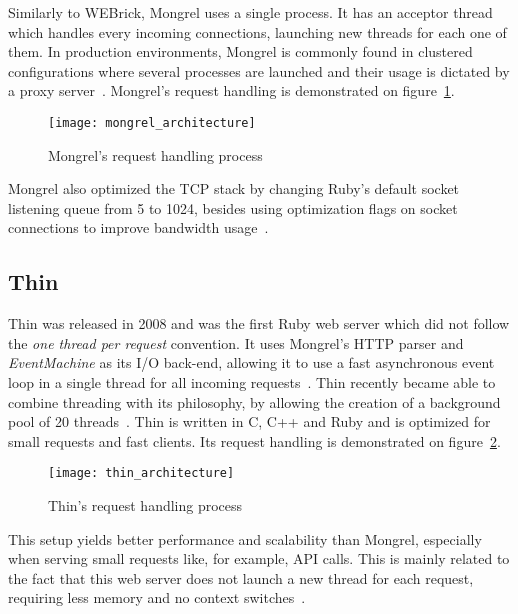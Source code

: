 Similarly to WEBrick, Mongrel uses a single process. It has an acceptor thread which handles every incoming connections, launching new threads for each one of them. In production environments, Mongrel is commonly found in clustered configurations where several processes are launched and their usage is dictated by a proxy server~\cite{mongrel_faq}. Mongrel's request handling is demonstrated on figure~\ref{fig:mongrel_architecture}.
\begin{figure}[h]
  \centering
    \texttt{[image: mongrel\_architecture]}
  \caption{Mongrel's request handling process}
  \label{fig:mongrel_architecture}
\end{figure}
Mongrel also optimized the TCP stack by changing Ruby's default socket listening queue from 5 to 1024, besides using optimization flags on socket connections to improve bandwidth usage~\cite{mongrel_faq}.


\subsection{Thin}
Thin was released in 2008 and was the first Ruby web server which did not follow the \textit{one thread per request} convention. It uses Mongrel's HTTP parser and \textit{EventMachine} as its I/O back-end, allowing it to use a fast asynchronous event loop in a single thread for all incoming requests~\cite{thin}. Thin recently became able to combine threading with its philosophy, by allowing the creation of a background pool of 20 threads~\cite{ruby_webservers}. Thin is written in C, C++ and Ruby and is optimized for small requests and fast clients. Its request handling is demonstrated on figure~\ref{fig:thin_architecture}.
\begin{figure}[h]
  \centering
    \texttt{[image: thin\_architecture]}
  \caption{Thin's request handling process}
  \label{fig:thin_architecture}
\end{figure}
This setup yields better performance and scalability than Mongrel, especially when serving small requests like, for example, API calls. This is mainly related to the fact that this web server does not launch a new thread for each request, requiring less memory and no context switches~\cite{ruby_webservers}.
 
